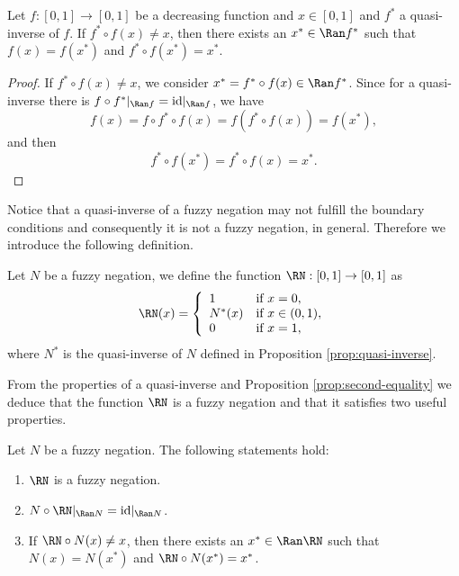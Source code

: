 \begin{proposition}\label{prop:second-equality}
	Let $f:[0,1] \to [0,1]$ be a decreasing function and $x \in [0,1]$ and $f^{*}$ a quasi-inverse of $f$. If $f^{*} \circ f(x) \not = x$, then there exists an $x^* \in \Ran f^*$ such that $f(x)=f(x^*)$ and $f^* \circ f(x^*)=x^*$.
\end{proposition}
\begin{proof}
	If $f^* \circ f(x) \not = x$, we consider $x^*=f^* \circ f(x) \in \Ran f^*$. Since for a quasi-inverse there is $f \circ f^*|_{\Ran f} = \text{id}|_{\Ran f}$, we have
	$$f(x)=f \circ f^* \circ f(x) = f(f^* \circ f(x))=f(x^*),$$
	and then
	$$f^* \circ f(x^*)=f^* \circ f(x)= x^*.$$
\end{proof}

Notice that a quasi-inverse of a fuzzy negation may not fulfill the boundary conditions and consequently it is not a fuzzy negation, in general. Therefore we introduce the following definition.
\begin{definition} Let $N$ be a fuzzy negation, we define the function $\RN:[0,1] \to [0,1]$ as
	$$
	\RN(x)
	= 
	\left\{ \begin{array}{ll}
		1 &   \text{if }   x=0, \\
		N^*(x) & \text{if } x \in (0,1), \\
		0 & \text{if } x=1,
	\end{array} \right.
	$$
	where $N^*$ is the quasi-inverse of $N$ defined in Proposition \ref{prop:quasi-inverse}.
\end{definition}
From the properties of a quasi-inverse and Proposition \ref{prop:second-equality} we deduce that the function $\RN$ is a fuzzy negation and that it satisfies two useful properties.
\begin{corollary}\label{cor:Nquasiinverseproperties}
	Let $N$ be a fuzzy negation. The following statements hold:
	\begin{enumerate}[label=(\roman*)]
		\item $\RN$ is a fuzzy negation.
		\item $N \circ \RN|_{\Ran N} = \text{id}|_{\Ran N}$.
		\item If $\RN \circ N(x) \not = x$, then there exists an $x^* \in \Ran \RN $ such that $N(x)=N(x^*)$ and $\RN \circ N (x^*)=x^*$.
	\end{enumerate}	
\end{corollary}
